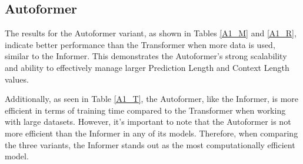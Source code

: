 \subsection{Autoformer}
The results for the Autoformer variant, as shown in Tables \ref{A1_M} and \ref{A1_R}, indicate better performance than the Transformer when more data is used, similar to the Informer. This demonstrates the Autoformer's strong scalability and ability to effectively manage larger Prediction Length and Context Length values.

Additionally, as seen in Table \ref{A1_T}, the Autoformer, like the Informer, is more efficient in terms of training time compared to the Transformer when working with large datasets. However, it's important to note that the Autoformer is not more efficient than the Informer in any of its models. Therefore, when comparing the three variants, the Informer stands out as the most computationally efficient model.


